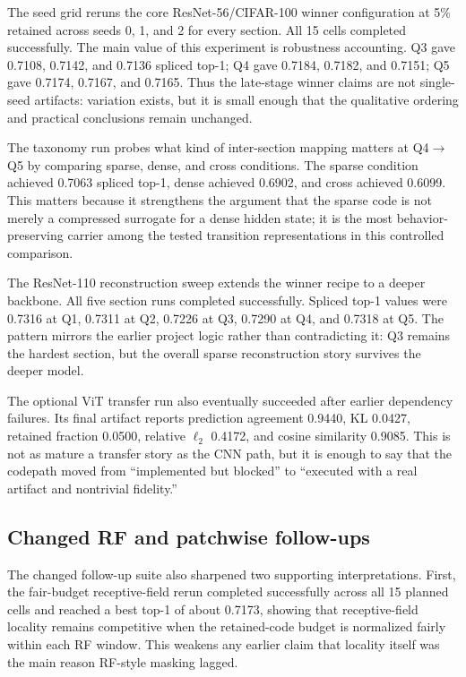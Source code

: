 \documentclass[11pt]{article}
\begin{document}
The seed grid reruns the core ResNet-56/CIFAR-100 winner configuration at 5\% retained across seeds 0, 1, and 2 for every section. All 15 cells completed successfully. The main value of this experiment is robustness accounting. Q3 gave 0.7108, 0.7142, and 0.7136 spliced top-1; Q4 gave 0.7184, 0.7182, and 0.7151; Q5 gave 0.7174, 0.7167, and 0.7165. Thus the late-stage winner claims are not single-seed artifacts: variation exists, but it is small enough that the qualitative ordering and practical conclusions remain unchanged.

The taxonomy run probes what kind of inter-section mapping matters at Q4$\rightarrow$Q5 by comparing sparse, dense, and cross conditions. The sparse condition achieved 0.7063 spliced top-1, dense achieved 0.6902, and cross achieved 0.6099. This matters because it strengthens the argument that the sparse code is not merely a compressed surrogate for a dense hidden state; it is the most behavior-preserving carrier among the tested transition representations in this controlled comparison.

The ResNet-110 reconstruction sweep extends the winner recipe to a deeper backbone. All five section runs completed successfully. Spliced top-1 values were 0.7316 at Q1, 0.7311 at Q2, 0.7226 at Q3, 0.7290 at Q4, and 0.7318 at Q5. The pattern mirrors the earlier project logic rather than contradicting it: Q3 remains the hardest section, but the overall sparse reconstruction story survives the deeper model.

The optional ViT transfer run also eventually succeeded after earlier dependency failures. Its final artifact reports prediction agreement 0.9440, KL 0.0427, retained fraction 0.0500, relative $\ell_2$ 0.4172, and cosine similarity 0.9085. This is not as mature a transfer story as the CNN path, but it is enough to say that the codepath moved from ``implemented but blocked'' to ``executed with a real artifact and nontrivial fidelity.''

\subsection{Changed RF and patchwise follow-ups}
The changed follow-up suite also sharpened two supporting interpretations. First, the fair-budget receptive-field rerun completed successfully across all 15 planned cells and reached a best top-1 of about 0.7173, showing that receptive-field locality remains competitive when the retained-code budget is normalized fairly within each RF window. This weakens any earlier claim that locality itself was the main reason RF-style masking lagged.
\end{document}
